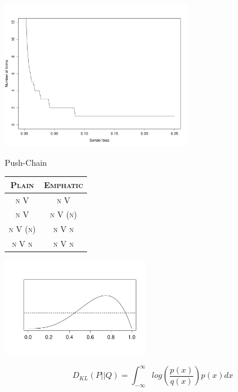 \documentclass[compress]{beamer}
\begin{document}
\begin{frame}{\cite{crawford-sobel:1982}}
     \begin{center}
	\includegraphics[height=2.5in]{bias.pdf}   
     \end{center}
\end{frame}

\begin{frame}{Push-Chain}
    \begin{center}
    \begin{tabular}{@{}cc@{}}
      \hline
       \textsc{Plain} & \textsc{Emphatic}\\
      \hline
      \textsc{n V} &  \textsc{n V}  \\
      \textsc{n V} &  \textsc{n V (n)}  \\
      \textsc{n V (n)} &  \textsc{n V n} \\
      \textsc{n V n} &  \textsc{n V n} \\
      \hline
    \end{tabular}
    \end{center}
\end{frame}


\begin{frame}{\cite{kullback-leibler1951divergence}}
  \begin{center}
       \includegraphics[width=2.5in]{kl-divergence.pdf}
  \end{center}
\begin{block}{}
\begin{equation}
     D_{KL}(P || Q) = \int_{-\infty}^{\infty} log\left( \frac{p(x)}{q(x)}  \right)p(x) dx
\end{equation}
\end{block}

\end{frame}
\end{document}
